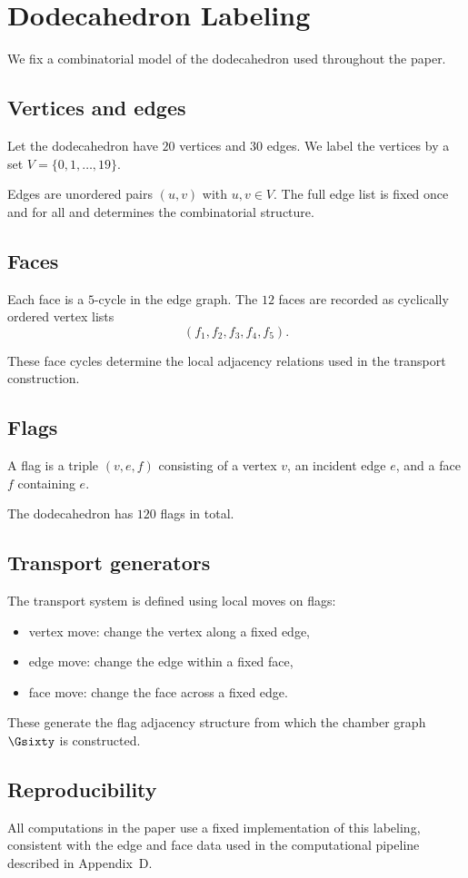 \section{Dodecahedron Labeling}

We fix a combinatorial model of the dodecahedron used throughout the
paper.

\subsection{Vertices and edges}

Let the dodecahedron have $20$ vertices and $30$ edges. We label the
vertices by a set $V = \{0,1,\dots,19\}$.

Edges are unordered pairs $(u,v)$ with $u,v \in V$. The full edge list
is fixed once and for all and determines the combinatorial structure.

\subsection{Faces}

Each face is a $5$-cycle in the edge graph. The $12$ faces are recorded
as cyclically ordered vertex lists
\[
(f_1, f_2, f_3, f_4, f_5).
\]

These face cycles determine the local adjacency relations used in the
transport construction.

\subsection{Flags}

A flag is a triple $(v,e,f)$ consisting of a vertex $v$, an incident
edge $e$, and a face $f$ containing $e$.

The dodecahedron has $120$ flags in total.

\subsection{Transport generators}

The transport system is defined using local moves on flags:
\begin{itemize}
\item vertex move: change the vertex along a fixed edge,
\item edge move: change the edge within a fixed face,
\item face move: change the face across a fixed edge.
\end{itemize}

These generate the flag adjacency structure from which the chamber
graph $\Gsixty$ is constructed.

\subsection{Reproducibility}

All computations in the paper use a fixed implementation of this
labeling, consistent with the edge and face data used in the
computational pipeline described in Appendix~D.
